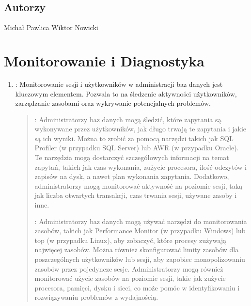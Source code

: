 \documentclass[letterpaper,10pt,polish]{sphinxmanual}
\begin{document}
\section{Autorzy}
\label{\detokenize{Sprawozdanie_bazy_p1/main:autorzy}}
\sphinxAtStartPar
Michał Pawlica
Wiktor Nowicki

\sphinxstepscope


\chapter{Monitorowanie i Diagnostyka}
\label{\detokenize{MonitDiagnostyka/cos/Monitorowanie_i_Diagnostyka:monitorowanie-i-diagnostyka}}\label{\detokenize{MonitDiagnostyka/cos/Monitorowanie_i_Diagnostyka::doc}}\begin{enumerate}
%
\item {} 
\sphinxAtStartPar
{}: Monitorowanie sesji i użytkowników w administracji baz danych jest kluczowym elementem. Pozwala to na śledzenie aktywności użytkowników, zarządzanie zasobami oraz wykrywanie potencjalnych problemów.
\begin{quote}

 : Administratorzy baz danych mogą śledzić, które zapytania są wykonywane przez użytkowników, jak długo trwają te zapytania i jakie są ich wyniki. Można to zrobić za pomocą narzędzi takich jak SQL Profiler (w przypadku SQL Server) lub AWR (w przypadku Oracle). Te narzędzia mogą dostarczyć szczegółowych informacji na temat zapytań, takich jak czas wykonania, zużycie procesora, ilość odczytów i zapisów na dysk, a nawet plan wykonania zapytania. Dodatkowo, administratorzy mogą monitorować aktywność na poziomie sesji, taką jak liczba otwartych transakcji, czas trwania sesji, używane zasoby i inne.

 : Administratorzy baz danych mogą używać narzędzi do monitorowania zasobów, takich jak Performance Monitor (w przypadku Windows) lub top (w przypadku Linux), aby zobaczyć, które procesy zużywają najwięcej zasobów. Można również skonfigurować limity zasobów dla poszczególnych użytkowników lub sesji, aby zapobiec monopolizowaniu zasobów przez pojedyncze sesje. Administratorzy mogą również monitorować użycie zasobów na poziomie sesji, takie jak zużycie procesora, pamięci, dysku i sieci, co może pomóc w identyfikowaniu i rozwiązywaniu problemów z wydajnością.


\end{quote}
\end{enumerate}
\end{document}
